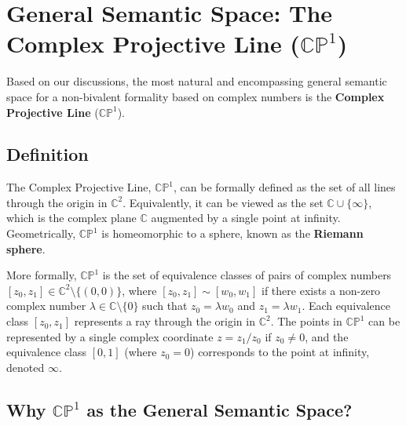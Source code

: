 \section{General Semantic Space: The Complex Projective Line ($\mathbb{CP}^1$)}
	
	Based on our discussions, the most natural and encompassing general semantic space for a non-bivalent formality based on complex numbers is the \textbf{Complex Projective Line} ($\mathbb{CP}^1$).
	
	\subsection{Definition}
	
	The Complex Projective Line, $\mathbb{CP}^1$, can be formally defined as the set of all lines through the origin in $\mathbb{C}^2$. Equivalently, it can be viewed as the set $\mathbb{C} \cup \{\infty\}$, which is the complex plane $\mathbb{C}$ augmented by a single point at infinity. Geometrically, $\mathbb{CP}^1$ is homeomorphic to a sphere, known as the \textbf{Riemann sphere}.
	
	More formally, $\mathbb{CP}^1$ is the set of equivalence classes of pairs of complex numbers $[z_0, z_1] \in \mathbb{C}^2 \setminus \{(0,0)\}$, where $[z_0, z_1] \sim [w_0, w_1]$ if there exists a non-zero complex number $\lambda \in \mathbb{C} \setminus \{0\}$ such that $z_0 = \lambda w_0$ and $z_1 = \lambda w_1$. Each equivalence class $[z_0, z_1]$ represents a ray through the origin in $\mathbb{C}^2$. The points in $\mathbb{CP}^1$ can be represented by a single complex coordinate $z = z_1/z_0$ if $z_0 \neq 0$, and the equivalence class $[0, 1]$ (where $z_0 = 0$) corresponds to the point at infinity, denoted $\infty$.
	
	\subsection{Why $\mathbb{CP}^1$ as the General Semantic Space?}
	
